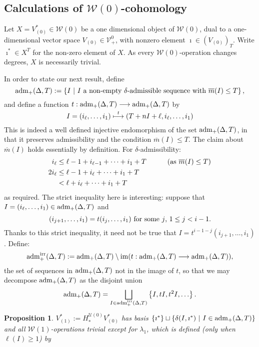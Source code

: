 \documentclass[11pt]{amsart}
\theoremstyle{plain}
\newtheorem{prop}[thm]{Proposition}
\theoremstyle{definition}
\DeclareMathOperator{\im}{im}
\renewcommand{\to}{\longrightarrow}
\newcommand{\calW}{\mathcal{W}}
\newcommand{\calU}{\mathcal{U}}
\newcommand{\calV}{\mathcal{V}}
\theoremstyle{plain}
\newcommand{\vect}[2]{\calV^{#1}_{#2}}
\newcommand{\minDimP}{\overline{m}}
\newcommand{\Sq}{\mathrm{Sq}}
\newcommand{\aDT}{\textup{adm}_+(\Delta,T)}
\newcommand{\aDTirr}{\textup{adm}_+^\textup{irr}(\Delta,T)}
\newcommand{\F}{\mathbb{F}}
\begin{document}
\begin{Calculations of HW0}
\vfil\pagebreak

\section{\textbf{Calculations of ${\calW(0)}$-cohomology}}
Let $X=V^*_{(0)}\in\calW(0)$ be a one dimensional object of $\calW(0)$, dual to a one-dimensional vector space $V_{(0)}\in\vect{0}{+}$, with nonzero element $\imath\in(V_{(0)})_T$. Write $\imath^*\in X^T$ for the non-zero element of $X$. As every $\calW(0)$-operation changes degrees, $X$ is necessarily trivial.

In order to state our next result, define
\[\aDT:=\left\{I\ \middle|\ \textup{$I$ a non-empty $\delta$-admissible sequence with }\minDimP(I)\leq T\right\},\]
and define a function $t:\aDT\to \aDT$ by
\[I=(i_{\ell},\ldots,i_1)\overset{\smash{t}}{\longmapsto }(T+nI+\ell,i_\ell,\ldots,i_1)\]
This is indeed a well defined injective endomorphism of the set $\aDT$, in that it preserves admissibility and the condition $\minDimP(I)\leq T$. The claim about $\minDimP(I)$ holds essentially by definition. For $\delta$-admissibility:
\begin{alignat*}{2}
i_{\ell}
&\leq
\ell-1+i_{\ell-1}+\cdots +i_1+T&\qquad&\textup{(as $\minDimP(I)\leq T$)}%
\\
2i_{\ell}
&\leq
\ell-1+i_{\ell}+\cdots +i_1+T\\
&< \ell+i_{\ell}+\cdots +i_1+T%
\end{alignat*}
as required. The strict inequality here is interesting: suppose that $I=(i_\ell,\ldots,i_1)\in \aDT$ and 
\[(i_{j+1},\ldots,i_1)=t(i_{j},\ldots,i_1)\textup{ for some $j$, $1\leq j<i-1$.}\]
Thanks to this strict inequality, it need not be true that $I=t^{i-1-j}(i_{j+1},\ldots,i_1)$. %
Define:
\[\aDTirr:= \aDT\setminus\im(t:\aDT\to\aDT),\]
the set of sequences in $\aDT$ not in the image of $t$, so that we may decompose $\aDT$ as the disjoint union
\[\aDT=\bigsqcup_{\smash{I\in \aDTirr}}\left\{I,tI,t^2I,\ldots\right\}.\]
\begin{prop}
\label{calc of V1 from W0 sphere}
$V^*_{(1)}:=H_*^{\calU(0)}V^*_{(0)}$ has basis $\{\imath^*\}\sqcup\left\{\delta(I,\imath^*)\ \middle|\ I\in\aDT\right\}$ and all $\calW(1)$-operations trivial except for $\lambda_1$, which is defined (only when $\ell(I)\geq1$) by

\end{prop}
\end{Calculations of HW0}
\end{document}

